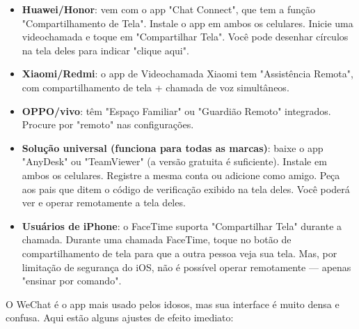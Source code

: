 \begin{itemize}
  \item \textbf{Huawei/Honor}: vem com o app "Chat Connect", que tem a função "Compartilhamento de Tela". Instale o app em ambos os celulares. Inicie uma videochamada e toque em "Compartilhar Tela". Você pode desenhar círculos na tela deles para indicar "clique aqui".
  \item \textbf{Xiaomi/Redmi}: o app de Videochamada Xiaomi tem "Assistência Remota", com compartilhamento de tela + chamada de voz simultâneos.
  \item \textbf{OPPO/vivo}: têm "Espaço Familiar" ou "Guardião Remoto" integrados. Procure por "remoto" nas configurações.
  \item \textbf{Solução universal (funciona para todas as marcas)}: baixe o app "AnyDesk" ou "TeamViewer" (a versão gratuita é suficiente). Instale em ambos os celulares. Registre a mesma conta ou adicione como amigo. Peça aos pais que ditem o código de verificação exibido na tela deles. Você poderá ver e operar remotamente a tela deles.
  \item \textbf{Usuários de iPhone}: o FaceTime suporta "Compartilhar Tela" durante a chamada. Durante uma chamada FaceTime, toque no botão de compartilhamento de tela para que a outra pessoa veja sua tela. Mas, por limitação de segurança do iOS, não é possível operar remotamente — apenas "ensinar por comando".
\end{itemize}


O WeChat é o app mais usado pelos idosos, mas sua interface é muito densa e confusa. Aqui estão alguns ajustes de efeito imediato:

